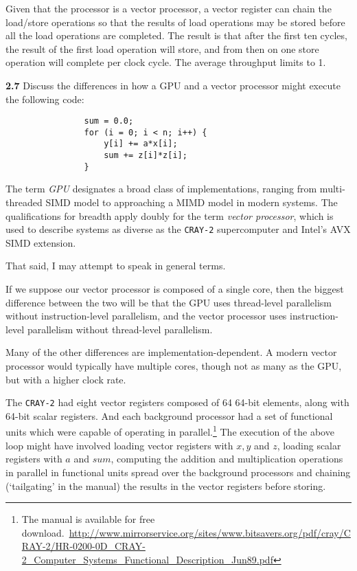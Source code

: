 \documentclass[11pt,epsfig,letterpaper]{article}
\begin{document}
\begin{enumerate}
            \quad Given that the processor is a vector processor, a vector register can chain the load/store operations so that the results of load operations may be stored before all the load operations are completed. The result is that after the first ten cycles, the result of the first load operation will store, and from then on one store operation will complete per clock cycle. The average throughput limits to 1.

            {\bf 2.7}  \>\>   Discuss the differences in how a GPU and a vector processor might execute the following code:
            \begin{verbatim}
                sum = 0.0;
                for (i = 0; i < n; i++) {
                    y[i] += a*x[i];
                    sum += z[i]*z[i];
                }
            \end{verbatim}
            \vspace{0.5pc}

            \quad The term {\it GPU} designates a broad class of implementations, ranging from multi-threaded SIMD model to approaching a MIMD model in modern systems. The qualifications for breadth apply doubly for the term {\it vector processor}, which is used to describe systems as diverse as the {\tt CRAY-2} supercomputer and Intel's AVX SIMD extension.

            \quad That said, I may attempt to speak in general terms.

            \quad If we suppose our vector processor is composed of a single core, then the biggest difference between the two will be that the GPU uses thread-level parallelism without instruction-level parallelism, and the vector processor uses instruction-level parallelism without thread-level parallelism.

            \quad Many of the other differences are implementation-dependent. A modern vector processor would typically have multiple cores, though not as many as the GPU, but with a higher clock rate.

            \quad The {\tt CRAY-2} had eight vector registers composed of 64 64-bit elements, along with 64-bit scalar registers. And each background processor had a set of functional units which were capable of operating in parallel.\footnote{The manual is available for free download.\
            \url{http://www.mirrorservice.org/sites/www.bitsavers.org/pdf/cray/CRAY-2/HR-0200-0D_CRAY-2_Computer_Systems_Functional_Description_Jun89.pdf}}
            The execution of the above loop might have involved loading vector registers with \(x, y\) and \(z\), loading scalar registers with $a$ and $sum$, computing the addition and multiplication operations in parallel in functional units spread over the background processors and chaining (`tailgating' in the manual) the results in the vector registers before storing.


\end{enumerate}
\end{document}
